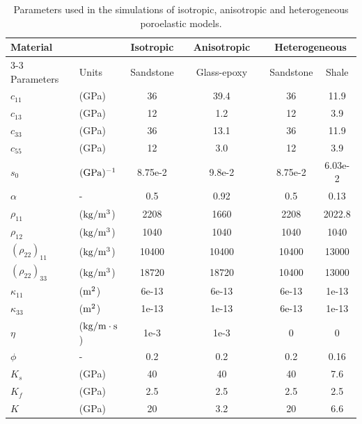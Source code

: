 \documentclass[10pt,letterpaper]{amsart}
\theoremstyle{plain} %
\theoremstyle{remark} %
\begin{document}
\begin{table}[htbp!] \small 
\centering
\caption{Parameters used in the simulations of isotropic, anisotropic and heterogeneous poroelastic models.}
\begin{tabular}{@{}ll@{\hskip 0.2in}cc@{}cc@{}cc@{}}
\toprule
\multicolumn{2}{l}{Material} & Isotropic &&  Anisotropic && \multicolumn{2}{c}{Heterogeneous} 
\\ \cmidrule{3-3} \cmidrule{5-5} \cmidrule{7-8} 
Parameters & Units & Sandstone && Glass-epoxy && Sandstone & Shale \\
\midrule
$c_{11}$    & (GPa)                 & 36     && 39.4   && 36     & 11.9 \\
$c_{13}$    & (GPa)                 & 12     && 1.2    && 12     & 3.9 \\
$c_{33}$    & (GPa)                 & 36     && 13.1   && 36     & 11.9 \\
$c_{55}$    & (GPa)                 & 12     && 3.0    && 12     & 3.9 \\
$s_0$       &  $({\rm GPa})^{-1}$   & 8.75e-2&& 9.8e-2 && 8.75e-2& 6.03e-2 \\
$\alpha$    &  -                    & 0.5    && 0.92   && 0.5    & 0.13\\
$\rho_{11}$ & ($\rm kg/m^3$)        & 2208   && 1660   && 2208   & 2022.8 \\
$\rho_{12}$ & ($\rm kg/m^3$)        & 1040   && 1040   && 1040   & 1040 \\
$(\rho_{22})_{11}$ & ($\rm kg/m^3$) & 10400  && 10400  && 10400  & 13000\\
$(\rho_{22})_{33}$ & ($\rm kg/m^3$) & 18720  && 18720  && 10400  & 13000 \\
$\kappa_{11}$      & ($\rm m^2$)    & 6e{-13}&& 6e{-13}&& 6e{-13} & 1e{-13}  \\
$\kappa_{33}$      & ($\rm m^2$)    & 1e{-13}&& 1e{-13}&& 6e{-13} & 1e{-13}\\
$\eta$      & ($\rm kg/m\cdot s$)   & 1e{-3} && 1e{-3} && 0& 0\\
$\phi$      &  -                    & 0.2    && 0.2    && 0.2    & 0.16\\
$K_s$       & (GPa)                 & 40     && 40     && 40     &  7.6\\
$K_f$       & (GPa)                 & 2.5    && 2.5    && 2.5    &  2.5\\
$K$         & (GPa)                 & 20     && 3.2    && 20     & 6.6\\
\bottomrule
\end{tabular}
\label{tab:materials}
\end{table}
\end{document}
